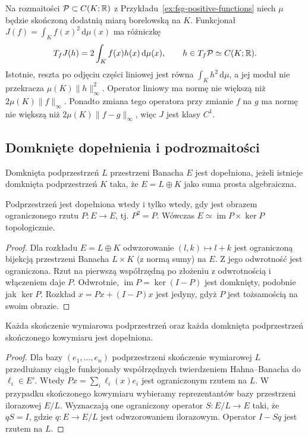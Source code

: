 \begin{przyklad}
\label{ex:fsg-integral-tangent}
Na rozmaitości $\mathcal P\subset C(K;\mathbb R)$ z
Przykładu~\ref{ex:fsg-positive-functions} niech $\mu$
będzie skończoną dodatnią miarą borelowską na $K$.
Funkcjonał $J(f)=\int_K f(x)^2\,\mathrm d\mu(x)$
ma różniczkę
\[
 T_fJ(h)=2\int_K f(x)h(x)\,\mathrm d\mu(x),
 \qquad h\in T_f\mathcal P\simeq C(K;\mathbb R).
\]
Istotnie, reszta po odjęciu części liniowej jest równa
$\int_K h^2\,\mathrm d\mu$, a jej moduł nie przekracza
$\mu(K)\|h\|_\infty^2$. Operator liniowy ma normę
nie większą niż $2\mu(K)\|f\|_\infty$.
Ponadto zmiana tego operatora przy zmianie $f$ na $g$
ma normę nie większą niż $2\mu(K)\|f-g\|_\infty$,
więc $J$ jest klasy $C^1$.
\end{przyklad}

\subsection{Domknięte dopełnienia i podrozmaitości}

\begin{definicja}
\label{def:fsg-complemented}
Domknięta podprzestrzeń $L$ przestrzeni Banacha $E$ jest
dopełniona, jeżeli istnieje domknięta podprzestrzeń $K$
taka, że $E=L\oplus K$ jako suma prosta algebraiczna.
\end{definicja}

\begin{stwierdzenie}
\label{prop:fsg-complement-projection}
Podprzestrzeń jest dopełniona wtedy i tylko wtedy, gdy jest
obrazem ograniczonego rzutu $P:E\to E$, tj. $P^2=P$.
Wówczas $E\simeq \operatorname{im}P\times\ker P$ topologicznie.
\end{stwierdzenie}
\begin{proof}
Dla rozkładu $E=L\oplus K$ odwzorowanie $(l,k)\mapsto l+k$
jest ograniczoną bijekcją przestrzeni Banacha $L\times K$
(z normą sumy) na $E$. Z
jego odwrotność jest ograniczona. Rzut na pierwszą
współrzędną po złożeniu z odwrotnością i włączeniem daje $P$.
Odwrotnie, $\operatorname{im}P=\ker(I-P)$ jest domknięty,
podobnie jak $\ker P$. Rozkład $x=Px+(I-P)x$ jest jedyny,
gdyż $P$ jest tożsamością na swoim obrazie.
\end{proof}

\begin{stwierdzenie}
\label{prop:fsg-finite-complements}
Każda skończenie wymiarowa podprzestrzeń oraz każda
domknięta podprzestrzeń skończonego kowymiaru jest dopełniona.
\end{stwierdzenie}
\begin{proof}
Dla bazy $(e_1,\ldots,e_n)$ podprzestrzeni skończenie
wymiarowej $L$ przedłużamy ciągłe funkcjonały współrzędnych
twierdzeniem Hahna--Banacha do $\ell_i\in E'$.
Wtedy $Px=\sum_i\ell_i(x)e_i$ jest ograniczonym rzutem
na $L$. W przypadku skończonego kowymiaru wybieramy
reprezentantów bazy przestrzeni ilorazowej $E/L$.
Wyznaczają one ograniczony operator $S:E/L\to E$
taki, że $qS=I$, gdzie $q:E\to E/L$ jest odwzorowaniem
ilorazowym. Operator $I-Sq$ jest rzutem na $L$.
\end{proof}

